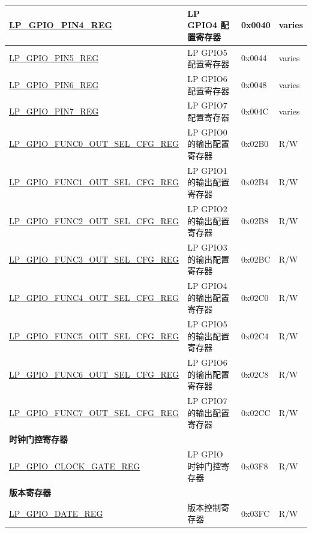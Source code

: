 \begin{longtable}{ | p{6cm} | p{7.2cm} | p{1.3cm} | p{1cm} | }
\hyperref[regdesc:LPGPIOPINNREG]{LP\_GPIO\_PIN4\_REG} & LP GPIO4 配置寄存器 & 0x0040 & varies \\ \hline
\hyperref[regdesc:LPGPIOPINNREG]{LP\_GPIO\_PIN5\_REG} & LP GPIO5 配置寄存器 & 0x0044 & varies \\ \hline
\hyperref[regdesc:LPGPIOPINNREG]{LP\_GPIO\_PIN6\_REG} & LP GPIO6 配置寄存器 & 0x0048 & varies \\ \hline
\hyperref[regdesc:LPGPIOPINNREG]{LP\_GPIO\_PIN7\_REG} & LP GPIO7 配置寄存器 & 0x004C & varies \\ \hline
\hyperref[regdesc:LPGPIOFUNCNOUTSELCFGREG]{LP\_GPIO\_FUNC0\_OUT\_SEL\_CFG\_REG} & LP GPIO0 的输出配置寄存器 & 0x02B0 & R/W \\ \hline
\hyperref[regdesc:LPGPIOFUNCNOUTSELCFGREG]{LP\_GPIO\_FUNC1\_OUT\_SEL\_CFG\_REG} & LP GPIO1 的输出配置寄存器 & 0x02B4 & R/W \\ \hline
\hyperref[regdesc:LPGPIOFUNCNOUTSELCFGREG]{LP\_GPIO\_FUNC2\_OUT\_SEL\_CFG\_REG} & LP GPIO2 的输出配置寄存器 & 0x02B8 & R/W \\ \hline
\hyperref[regdesc:LPGPIOFUNCNOUTSELCFGREG]{LP\_GPIO\_FUNC3\_OUT\_SEL\_CFG\_REG} & LP GPIO3 的输出配置寄存器 & 0x02BC & R/W \\ \hline
\hyperref[regdesc:LPGPIOFUNCNOUTSELCFGREG]{LP\_GPIO\_FUNC4\_OUT\_SEL\_CFG\_REG} & LP GPIO4 的输出配置寄存器 & 0x02C0 & R/W \\ \hline
\hyperref[regdesc:LPGPIOFUNCNOUTSELCFGREG]{LP\_GPIO\_FUNC5\_OUT\_SEL\_CFG\_REG} & LP GPIO5 的输出配置寄存器 & 0x02C4 & R/W \\ \hline
\hyperref[regdesc:LPGPIOFUNCNOUTSELCFGREG]{LP\_GPIO\_FUNC6\_OUT\_SEL\_CFG\_REG} & LP GPIO6 的输出配置寄存器 & 0x02C8 & R/W \\ \hline
\hyperref[regdesc:LPGPIOFUNCNOUTSELCFGREG]{LP\_GPIO\_FUNC7\_OUT\_SEL\_CFG\_REG} & LP GPIO7 的输出配置寄存器 & 0x02CC & R/W \\ \hline
\multicolumn{4}{|l|}{\textbf{时钟门控寄存器}} \\ \hline
\hyperref[regdesc:LPGPIOCLOCKGATEREG]{LP\_GPIO\_CLOCK\_GATE\_REG} & LP GPIO 时钟门控寄存器 & 0x03F8 & R/W \\ \hline
\multicolumn{4}{|l|}{\textbf{版本寄存器}} \\ \hline
\hyperref[regdesc:LPGPIODATEREG]{LP\_GPIO\_DATE\_REG} & 版本控制寄存器 & 0x03FC & R/W \\ \hline
\end{longtable}
